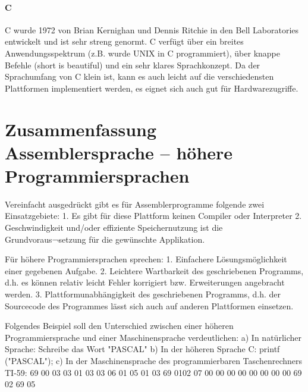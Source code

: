 \paragraph{C}
C wurde 1972 von Brian Kernighan und Dennis Ritchie in den Bell Laboratories entwickelt und ist sehr streng genormt. C verfügt über ein breites Anwendungsspektrum (z.B. wurde UNIX in C programmiert), über knappe Befehle (short is beautiful) und ein sehr klares Sprachkonzept.
Da der Sprachumfang von C klein ist, kann es auch leicht auf die verschiedensten Plattformen implementiert werden, es eignet sich auch gut für Hardwarezugriffe.


\section{Zusammenfassung Assemblersprache – höhere Programmiersprachen}
Vereinfacht ausgedrückt gibt es für Assemblerprogramme folgende zwei Einsatzgebiete:
1.	Es gibt für diese Plattform keinen Compiler oder Interpreter
2.	Geschwindigkeit und/oder effiziente Speichernutzung ist die Grundvoraus¬setzung für die gewünschte Applikation.

Für höhere Programmiersprachen sprechen:
1.	Einfachere Lösungsmöglichkeit einer gegebenen Aufgabe.
2.	Leichtere Wartbarkeit des geschriebenen Programms, d.h. es können relativ leicht Fehler korrigiert bzw. Erweiterungen angebracht werden.
3.	Plattformunabhängigkeit des geschriebenen Programms, d.h. der Sourcecode des Programmes lässt sich auch auf anderen Plattformen einsetzen.

Folgendes Beispiel soll den Unterschied zwischen einer höheren Programmiersprache und einer Maschinensprache verdeutlichen:
a) In natürlicher Sprache: Schreibe das Wort "PASCAL" 
b) In der höheren Sprache C: printf ("PASCAL"); 
c) In der Maschinensprache des programmierbaren Taschenrechners TI-59:
69 00 03 03 01 03 03 06 01 05 01 03 69 0102 07 00 00 00 00 00 00 00 00 69 02 69 05
